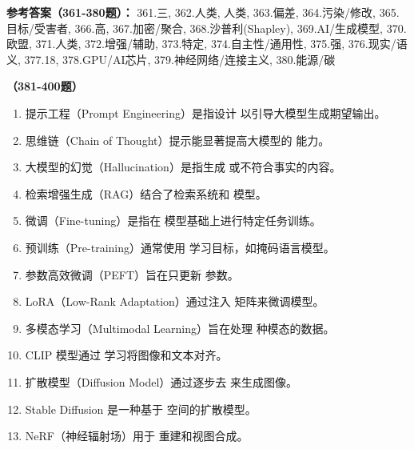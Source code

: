 \textbf{参考答案（361-380题）：}
361.三, 362.人类, 人类, 363.偏差, 364.污染/修改, 365.目标/受害者, 366.高, 367.加密/聚合, 368.沙普利(Shapley), 369.AI/生成模型, 370.欧盟, 371.人类, 372.增强/辅助, 373.特定, 374.自主性/通用性, 375.强, 376.现实/语义, 377.18, 378.GPU/AI芯片, 379.神经网络/连接主义, 380.能源/碳

\vspace{1em}
\textbf{（381-400题）}
\begin{enumerate}[resume,leftmargin=2em,itemsep=1pt]
\item 提示工程（Prompt Engineering）是指设计 \underline{\hspace{3em}} 以引导大模型生成期望输出。
\item 思维链（Chain of Thought）提示能显著提高大模型的 \underline{\hspace{3em}} 能力。
\item 大模型的幻觉（Hallucination）是指生成 \underline{\hspace{3em}} 或不符合事实的内容。
\item 检索增强生成（RAG）结合了检索系统和 \underline{\hspace{3em}} 模型。
\item 微调（Fine-tuning）是指在 \underline{\hspace{3em}} 模型基础上进行特定任务训练。
\item 预训练（Pre-training）通常使用 \underline{\hspace{3em}} 学习目标，如掩码语言模型。
\item 参数高效微调（PEFT）旨在只更新 \underline{\hspace{3em}} 参数。
\item LoRA（Low-Rank Adaptation）通过注入 \underline{\hspace{3em}} 矩阵来微调模型。
\item 多模态学习（Multimodal Learning）旨在处理 \underline{\hspace{3em}} 种模态的数据。
\item CLIP 模型通过 \underline{\hspace{3em}} 学习将图像和文本对齐。
\item 扩散模型（Diffusion Model）通过逐步去 \underline{\hspace{3em}} 来生成图像。
\item Stable Diffusion 是一种基于 \underline{\hspace{3em}} 空间的扩散模型。
\item NeRF（神经辐射场）用于 \underline{\hspace{3em}} 重建和视图合成。

\end{enumerate}
